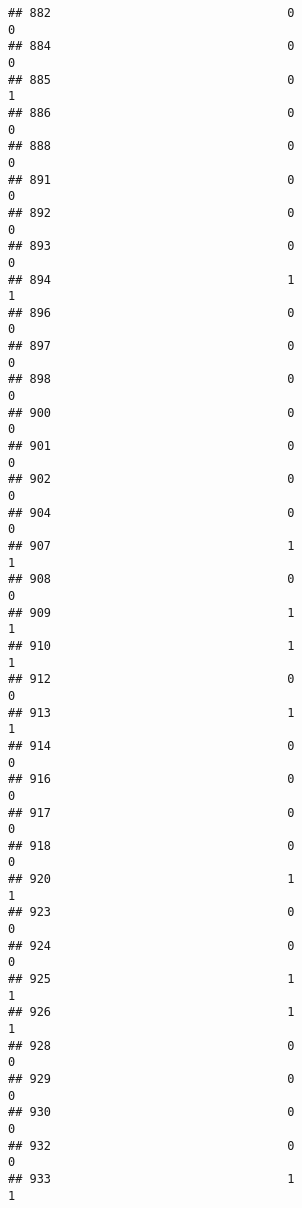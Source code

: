\documentclass[
]{article}
\begin{document}
\begin{verbatim}
## 882                                 0                                0
## 884                                 0                                0
## 885                                 0                                1
## 886                                 0                                0
## 888                                 0                                0
## 891                                 0                                0
## 892                                 0                                0
## 893                                 0                                0
## 894                                 1                                1
## 896                                 0                                0
## 897                                 0                                0
## 898                                 0                                0
## 900                                 0                                0
## 901                                 0                                0
## 902                                 0                                0
## 904                                 0                                0
## 907                                 1                                1
## 908                                 0                                0
## 909                                 1                                1
## 910                                 1                                1
## 912                                 0                                0
## 913                                 1                                1
## 914                                 0                                0
## 916                                 0                                0
## 917                                 0                                0
## 918                                 0                                0
## 920                                 1                                1
## 923                                 0                                0
## 924                                 0                                0
## 925                                 1                                1
## 926                                 1                                1
## 928                                 0                                0
## 929                                 0                                0
## 930                                 0                                0
## 932                                 0                                0
## 933                                 1                                1

\end{verbatim}
\end{document}
